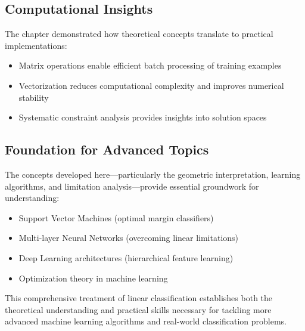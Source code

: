 \subsection{Computational Insights}
The chapter demonstrated how theoretical concepts translate to practical implementations:
\begin{itemize}
    \item Matrix operations enable efficient batch processing of training examples
    \item Vectorization reduces computational complexity and improves numerical stability
    \item Systematic constraint analysis provides insights into solution spaces
\end{itemize}

\subsection{Foundation for Advanced Topics}
The concepts developed here—particularly the geometric interpretation, learning algorithms, and limitation analysis—provide essential groundwork for understanding:
\begin{itemize}
    \item Support Vector Machines (optimal margin classifiers)
    \item Multi-layer Neural Networks (overcoming linear limitations)
    \item Deep Learning architectures (hierarchical feature learning)
    \item Optimization theory in machine learning
\end{itemize}

This comprehensive treatment of linear classification establishes both the theoretical understanding and practical skills necessary for tackling more advanced machine learning algorithms and real-world classification problems.